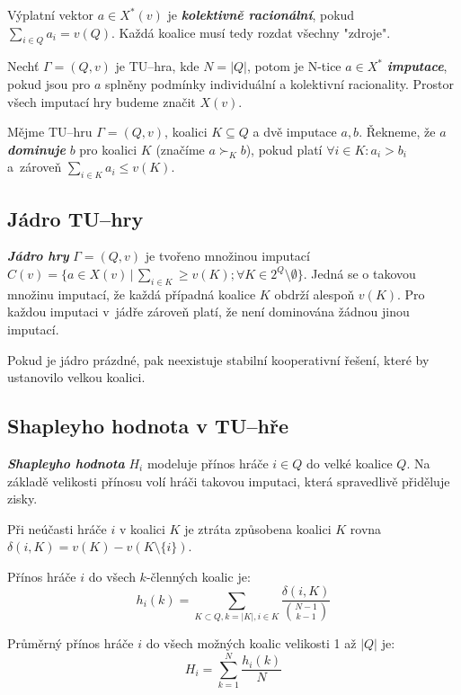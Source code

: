         Výplatní vektor $a \in X^*(v)$ je \textit{\textbf{kolektivně racionální}}, pokud $\sum_{i \in Q}a_i = v(Q)$. Každá koalice musí tedy rozdat všechny "zdroje".

        Nechť $\Gamma = (Q, v)$ je TU--hra, kde $N = |Q|$, potom je N-tice $a \in X^*$ \textit{\textbf{imputace}}, pokud jsou pro $a$ splněny podmínky individuální a kolektivní racionality. Prostor všech imputací hry budeme značit $X(v)$.

        Mějme TU--hru $\Gamma = (Q, v)$, koalici $K \subseteq Q$ a dvě imputace $a, b$. Řekneme, že $a$ \textit{\textbf{dominuje}} $b$ pro koalici $K$ (značíme $a \succ_K b$), pokud platí $\forall i \in K: a_i > b_i$ a~zároveň $\sum_{i \in K}a_i \leq v(K)$.

    \subsection{Jádro TU--hry}
        \textit{\textbf{Jádro hry}} $\Gamma = (Q, v)$ je tvořeno množinou imputací $C(v) = \{a \in X(v)\,|\,\sum_{i \in K} \geq v(K); \forall K \in 2^Q \setminus \emptyset\}$. Jedná se o takovou množinu imputací, že každá případná koalice $K$ obdrží alespoň $v(K)$. Pro každou imputaci v~jádře zároveň platí, že není dominována žádnou jinou imputací.

        Pokud je jádro prázdné, pak neexistuje stabilní kooperativní řešení, které by ustanovilo velkou koalici.

    \subsection{Shapleyho hodnota v TU--hře}
        \textit{\textbf{Shapleyho hodnota}} \cite{Shapley1953} $H_i$ modeluje přínos hráče $i \in Q$ do velké koalice $Q$. Na základě velikosti přínosu  volí hráči takovou imputaci, která spravedlivě přiděluje zisky.

        Při neúčasti hráče $i$ v koalici $K$ je ztráta způsobena koalici $K$ rovna $\delta(i, K) = v(K) - v(K \setminus \{i\})$.

        Přínos hráče $i$ do všech $k$-členných koalic je:
        \vspace*{-0.3em}
        $$
        h_i(k) = \sum_{K \subset Q, k = |K|, i \in K}\frac{\delta(i, K)}{{{N-1} \choose {k-1}}}
        $$

        Průměrný přínos hráče $i$ do všech možných koalic velikosti 1 až $|Q|$ je:
        \vspace*{-0.3em}
        $$
        H_i = \sum^N_{k = 1}\frac{h_i(k)}{N}
        $$

